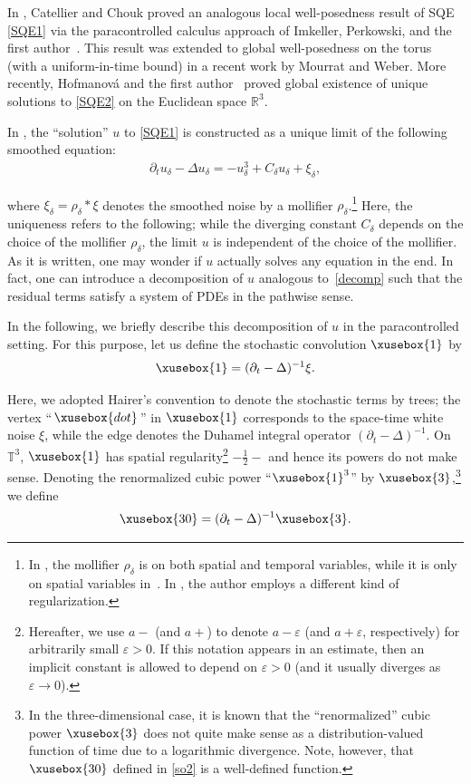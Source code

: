 \documentclass[%
11pt,  reqno]{amsart}
\def\<#1>{\xusebox{#1}}
\newcommand{\1}{\hspace{0.2mm}\text{I}\hspace{0.2mm}}
\newcommand{\noi}{\noindent}
\newcommand{\R}{\mathbb{R}}
\newcommand{\T}{\mathbb{T}}
\newcommand{\dl}{\delta}
\newcommand{\Dl}{\Delta}
\newcommand{\eps}{\varepsilon}
\newcommand{\dt}{\partial_t}
\numberwithin{equation}{section}
\numberwithin{theorem}{section}
\begin{document}
In \cite{CC}, Catellier and Chouk
proved an analogous local well-posedness result of SQE \eqref{SQE1} 
via the paracontrolled calculus approach of Imkeller, Perkowski,  and the first author~\cite{GIP}.
This result was extended to global well-posedness on the torus
(with a uniform-in-time bound) 
in a recent work \cite{MW1}
by Mourrat and Weber. 
More recently,  Hofmanov\'a and the first author~\cite{GH18} 
proved global  existence of unique solutions to \eqref{SQE2} on the Euclidean space $\R^3$.

In \cite{Hairer, CC}, 
the ``solution'' $u$ to \eqref{SQE1}
is constructed as a unique limit
of the following smoothed equation:
\begin{align}
\dt u_\dl -  \Dl u_\dl = - u_\dl^3 + C_\dl u_\dl  + \xi_\dl, 
\label{SQE2}
\end{align}

\noi
where $ \xi_\dl =  \rho_\dl * \xi$
denotes the smoothed noise
by a mollifier $\rho_\dl$.\footnote{In \cite{Hairer}, 
the mollifier $\rho_\dl$ is on both spatial and temporal variables, 
while it is only on spatial variables in~\cite{CC}.
In \cite{Kupi}, the author employs a different kind of regularization.}
Here, the uniqueness refers to the following;
while  the diverging constant $C_\dl$ depends
on the choice of the  mollifier $\rho_\dl$, 
the limit $u$ is independent of the choice of the mollifier.
As it is written, 
one may wonder if $u$ actually solves any equation in the end.
In fact, one can introduce a decomposition of $u$
analogous to~\eqref{decomp}
such that the residual terms satisfy a system
of PDEs in the pathwise sense.



In the following, we briefly describe this decomposition of $u$
in the paracontrolled setting.
For this purpose, let us define
the stochastic convolution 
$\<1>$  
by 
\begin{align*}
 \<1> = (\dt - \Dl)^{-1} \xi.
\end{align*}

\noi
Here,  we adopted Hairer's convention to denote the stochastic terms by trees;
the vertex ``\,$\<dot>$\,'' in $\<1>$ corresponds to the space-time white noise $\xi$,
while the edge denotes the Duhamel integral operator $(\dt - \Dl)^{-1}$.
On $\T^3$, $\<1>$ has spatial regularity\footnote{Hereafter, we use $a-$ 
(and $a+$) to denote $a- \eps$ (and $a+ \eps$, respectively)
for arbitrarily small $\eps > 0$.
If this notation appears in an estimate, 
then  an implicit constant 
is allowed to depend on $\eps> 0$ (and it usually diverges as $\eps \to 0$).
}
$-\frac 12 -$
and hence its powers do not make sense.
Denoting the renormalized cubic power ``$\<1>^3$''
by $\<3>$,\footnote{In the three-dimensional case, it is known that the ``renormalized'' cubic 
power $\<3>$ does not quite make sense as a distribution-valued function
of time due to a logarithmic divergence.
Note, however, that   $\<30>$ defined in \eqref{so2} is a well-defined function.}
we define
\begin{align}
  \<30> = (\dt - \Dl)^{-1} \<3>.
\label{so2}
\end{align}
\end{document}
